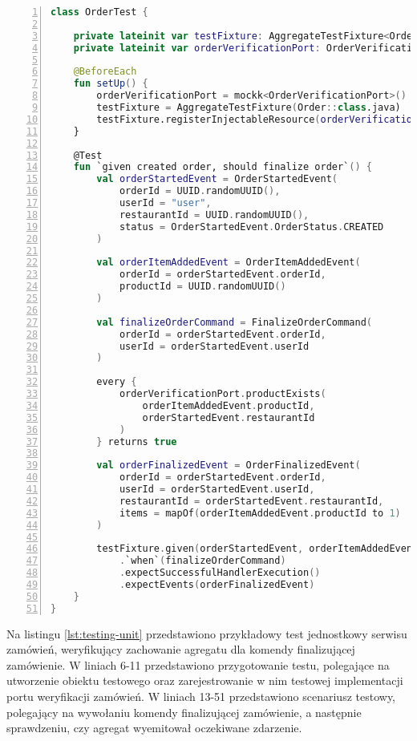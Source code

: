 \begin{lstlisting}[caption={Przykładowy test jednostkowy serwisu zamówień},label={lst:testing-unit},captionpos=b,language=Kotlin,numbers=left]
class OrderTest {

    private lateinit var testFixture: AggregateTestFixture<Order>
    private lateinit var orderVerificationPort: OrderVerificationPort

    @BeforeEach
    fun setUp() {
        orderVerificationPort = mockk<OrderVerificationPort>()
        testFixture = AggregateTestFixture(Order::class.java)
        testFixture.registerInjectableResource(orderVerificationPort)
    }

    @Test
    fun `given created order, should finalize order`() {
        val orderStartedEvent = OrderStartedEvent(
            orderId = UUID.randomUUID(),
            userId = "user",
            restaurantId = UUID.randomUUID(),
            status = OrderStartedEvent.OrderStatus.CREATED
        )

        val orderItemAddedEvent = OrderItemAddedEvent(
            orderId = orderStartedEvent.orderId,
            productId = UUID.randomUUID()
        )

        val finalizeOrderCommand = FinalizeOrderCommand(
            orderId = orderStartedEvent.orderId,
            userId = orderStartedEvent.userId
        )

        every {
            orderVerificationPort.productExists(
                orderItemAddedEvent.productId,
                orderStartedEvent.restaurantId
            )
        } returns true

        val orderFinalizedEvent = OrderFinalizedEvent(
            orderId = orderStartedEvent.orderId,
            userId = orderStartedEvent.userId,
            restaurantId = orderStartedEvent.restaurantId,
            items = mapOf(orderItemAddedEvent.productId to 1)
        )

        testFixture.given(orderStartedEvent, orderItemAddedEvent)
            .`when`(finalizeOrderCommand)
            .expectSuccessfulHandlerExecution()
            .expectEvents(orderFinalizedEvent)
    }
}
\end{lstlisting}

Na listingu \ref{lst:testing-unit} przedstawiono przykładowy test jednostkowy serwisu zamówień, weryfikujący zachowanie agregatu dla komendy finalizującej zamówienie. W liniach 6-11 przedstawiono przygotowanie testu, polegające na utworzenie obiektu testowego oraz zarejestrowanie w nim testowej implementacji portu weryfikacji zamówień. W liniach 13-51 przedstawiono scenariusz testowy, polegający na wywołaniu komendy finalizującej zamówienie, a następnie sprawdzeniu, czy agregat wyemitował oczekiwane zdarzenie.

